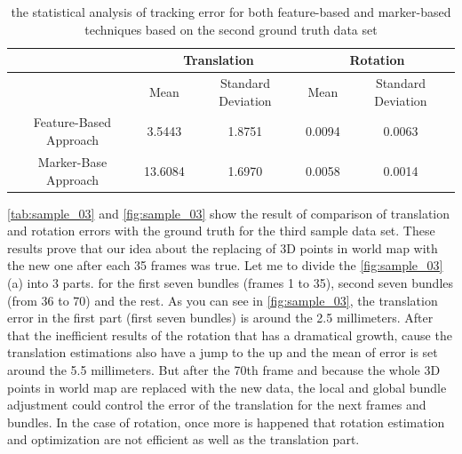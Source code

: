 \begin{table}[H]
\centering
  \begin{tabular}{| c || c | c | c | c |}
      \hline
      & \multicolumn{2}{c|}{Translation} & \multicolumn{2}{c|}{Rotation} \\ \hline
       & Mean & Standard Deviation & Mean & Standard Deviation \\ \hline
      Feature-Based Approach & 3.5443 & 1.8751 & 0.0094 & 0.0063 \\ \hline
      Marker-Base Approach & 13.6084 & 1.6970 & 0.0058 & 0.0014 \\ \hline
  \end{tabular}
  \caption{the statistical analysis of tracking error for both feature-based and marker-based techniques based on the second ground truth data set} \label{tab:sample_03}
\end{table}

\autoref{tab:sample_03} and \autoref{fig:sample_03} show the result of comparison of translation and rotation errors with the ground truth for the third sample data set. These results prove that our idea about the replacing of 3D points in world map with the new one after each 35 frames was true. Let me to divide the \autoref{fig:sample_03}(a) into 3 parts. for the first seven bundles (frames 1 to 35), second seven bundles (from 36 to 70) and the rest. As you can see in \autoref{fig:sample_03}, the translation error in the first part (first seven bundles) is around the 2.5 millimeters. After that the inefficient results of the rotation that has a dramatical growth, cause the translation estimations also have a jump to the up and the mean of error is set around the 5.5 millimeters. But after the 70th frame and because the whole 3D points in world map are replaced with the new data, the local and global bundle adjustment could control the error of the translation for the next frames and bundles. In the case of rotation, once more is happened that rotation estimation and optimization are not efficient as well as the translation part.

